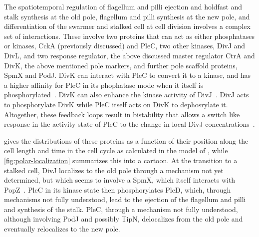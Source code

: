 The spatiotemporal regulation of flagellum and pilli ejection and holdfast and stalk synthesis at the old pole, flagellum and pilli synthesis at the new pole, and differentiation of the swarmer and stalked cell at cell division involves a complex set of interactions.
These involve two proteins that can act as either phosphatases or kinases, CckA (previously discussed) and PleC, two other kinases, DivJ and DivL, and two response regulator, the above discussed master regulator CtrA and DivK, the above mentioned pole markers, and further pole scaffold proteins, SpmX and PodJ.
DivK can interact with PleC to convert it to a kinase, and has a higher affinity for PleC in its phophatase mode when it itself is phosphorylated~\cite{subramanian2017}.
DivK can also enhance the kinase activity of DivJ~\cite{kirkpatrick2012}.
DivJ acts to phosphorylate DivK while PleC itself acts on DivK to dephosrylate it.
Altogether, these feedback loops result in bistability that allows a switch like response in the activity state of PleC to the change in local DivJ concentrations~\cite{subramanian2017}.

 gives the distributions of these proteins as a function of their position along the cell length and time in the cell cycle as calculated in the model of \textcite{subramanian2015}, while \cref{fig:polar-localization} summarizes this into a cartoon.
At the transition to a stalked cell, DivJ localizes to the old pole through a mechanism not yet determined, but which seems to involve a SpmX, which itself interacts with PopZ~\cite{kirkpatrick2012}.
PleC in its kinase state then phosphorylates PleD, which, through mechanisms not fully understood, lead to the ejection of the flagellum and pilli and synthesis of the stalk.
PleC, through a mechanism not fully understood, although involving PodJ and possibly TipN, delocalizes from the old pole and eventually relocalizes to the new pole.

